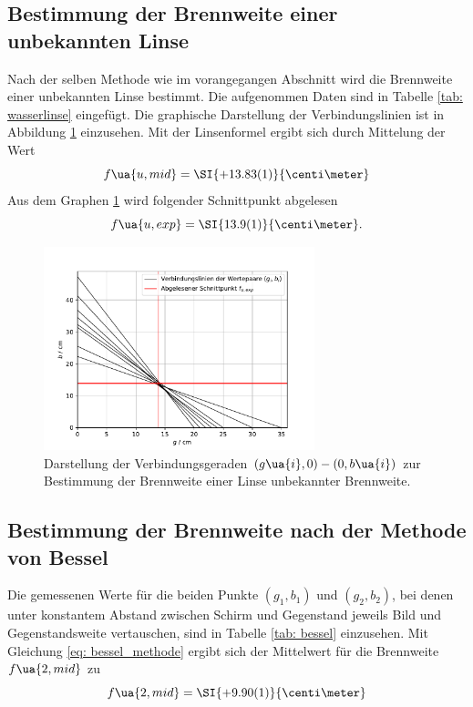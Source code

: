 \subsection{Bestimmung der Brennweite einer unbekannten Linse}
Nach der selben Methode wie im vorangegangen Abschnitt wird die Brennweite einer unbekannten Linse bestimmt.
Die aufgenommen Daten sind in Tabelle \ref{tab: wasserlinse} eingefügt. Die graphische Darstellung der Verbindungslinien ist
in Abbildung \ref{fig: wasserlinse} einzusehen. Mit der Linsenformel ergibt sich durch Mittelung der Wert
\begin{equation}
  f\ua{u, mid} = \SI{+13.83(1)}{\centi\meter}
\end{equation}
Aus dem Graphen \ref{fig: wasserlinse} wird folgender Schnittpunkt abgelesen
\begin{equation}
  f\ua{u, exp} = \SI{13.9(1)}{\centi\meter}.
\end{equation}

\begin{figure}
  \centering
  \includegraphics[width = 0.7\textwidth]{../Messdaten/plots/wasserlinse.pdf}
  \caption{Darstellung der Verbindungsgeraden $(g\ua{i}, 0) - (0, b\ua{i})$ zur Bestimmung der Brennweite einer
  Linse unbekannter Brennweite.}
  \label{fig: wasserlinse}
\end{figure}

\subsection{Bestimmung der Brennweite nach der Methode von Bessel}
Die gemessenen Werte für die beiden Punkte $(g_1, b_1)$ und $(g_2, b_2)$, bei denen unter konstantem Abstand
zwischen Schirm und Gegenstand jeweils Bild und Gegenstandsweite
vertauschen, sind in Tabelle \ref{tab: bessel} einzusehen. Mit Gleichung \eqref{eq: bessel_methode} ergibt sich der Mittelwert für
die Brennweite $f\ua{2, mid}$ zu
\begin{equation}
  f\ua{2, mid} = \SI{+9.90(1)}{\centi\meter}
  \label{eq: f_bessel}
\end{equation}

